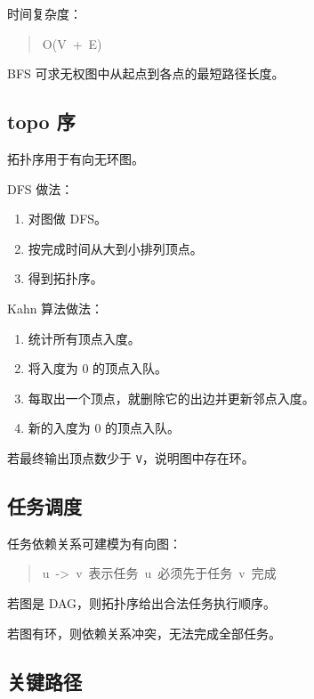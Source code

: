 \documentclass[UTF8,zihao=-4]{ctexart}
\begin{document}
时间复杂度：

\begin{quote}
\small\ttfamily\raggedright
\relax O(V\ +\ E)\\
\end{quote}

BFS 可求无权图中从起点到各点的最短路径长度。

\subsection*{topo 序}

拓扑序用于有向无环图。

DFS 做法：

\begin{enumerate}
\item 对图做 DFS。
\item 按完成时间从大到小排列顶点。
\item 得到拓扑序。
\end{enumerate}

Kahn 算法做法：

\begin{enumerate}
\item 统计所有顶点入度。
\item 将入度为 0 的顶点入队。
\item 每取出一个顶点，就删除它的出边并更新邻点入度。
\item 新的入度为 0 的顶点入队。
\end{enumerate}

若最终输出顶点数少于 \texttt{V}，说明图中存在环。

\subsection*{任务调度}

任务依赖关系可建模为有向图：

\begin{quote}
\small\ttfamily\raggedright
\relax u\ ->\ v\ 表示任务\ u\ 必须先于任务\ v\ 完成\\
\end{quote}

若图是 DAG，则拓扑序给出合法任务执行顺序。

若图有环，则依赖关系冲突，无法完成全部任务。

\subsection*{关键路径}
\end{document}
